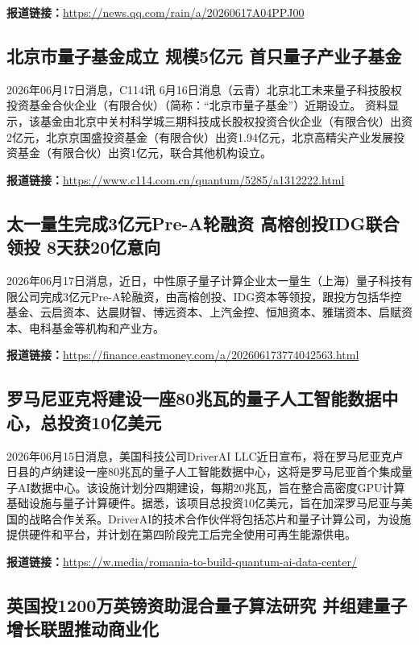 \documentclass[12pt,a4paper]{ctexart}
\begin{document}
\noindent\textbf{报道链接：}\url{https://news.qq.com/rain/a/20260617A04PPJ00}

\subsection{ 北京市量子基金成立 规模5亿元 首只量子产业子基金 }

2026年06月17日消息，C114讯 6月16日消息（云青）北京北工未来量子科技股权投资基金合伙企业（有限合伙）（简称：“北京市量子基金”）近期设立。 资料显示，该基金由北京中关村科学城三期科技成长股权投资合伙企业（有限合伙）出资2亿元，北京京国盛投资基金（有限合伙）出资1.94亿元，北京高精尖产业发展投资基金（有限合伙）出资1亿元，联合其他机构设立。

\noindent\textbf{报道链接：}\url{https://www.c114.com.cn/quantum/5285/a1312222.html}

\subsection{ 太一量生完成3亿元Pre-A轮融资 高榕创投IDG联合领投 8天获20亿意向 }

2026年06月17日消息，近日，中性原子量子计算企业太一量生（上海）量子科技有限公司完成3亿元Pre-A轮融资，由高榕创投、IDG资本等领投，跟投方包括华控基金、云启资本、达晨财智、博远资本、上汽金控、恒旭资本、雅瑞资本、启赋资本、电科基金等机构和产业方。

\noindent\textbf{报道链接：}\url{https://finance.eastmoney.com/a/202606173774042563.html}

\subsection{ 罗马尼亚克将建设一座80兆瓦的量子人工智能数据中心，总投资10亿美元 }

2026年06月15日消息，美国科技公司DriverAI LLC近日宣布，将在罗马尼亚克卢日县的卢纳建设一座80兆瓦的量子人工智能数据中心，这将是罗马尼亚首个集成量子AI数据中心。该设施计划分四期建设，每期20兆瓦，旨在整合高密度GPU计算基础设施与量子计算硬件。据悉，该项目总投资10亿美元，旨在加深罗马尼亚与美国的战略合作关系。DriverAI的技术合作伙伴将包括芯片和量子计算公司，为设施提供硬件和平台，并计划在第四阶段完工后完全使用可再生能源供电。

\noindent\textbf{报道链接：}\url{https://w.media/romania-to-build-quantum-ai-data-center/}

\subsection{ 英国投1200万英镑资助混合量子算法研究 并组建量子增长联盟推动商业化 }
\end{document}
